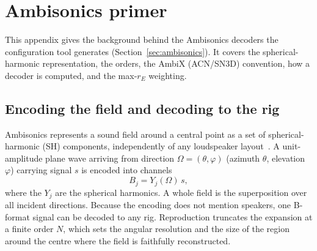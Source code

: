 \chapter{Ambisonics primer}\label{ch:ambiprimer}
This appendix gives the background behind the Ambisonics decoders the configuration tool generates (Section~\ref{sec:ambisonics}). It covers the spherical-harmonic representation, the orders, the AmbiX (ACN/SN3D) convention, how a decoder is computed, and the max-\(r_E\) weighting.

\section{Encoding the field and decoding to the rig}
Ambisonics represents a sound field around a central point as a set of spherical-harmonic (SH) components, independently of any loudspeaker layout~\cite{Gerzon1973,Daniel2000}. A unit-amplitude plane wave arriving from direction \(\Omega=(\theta,\varphi)\) (azimuth \(\theta\), elevation \(\varphi\)) carrying signal \(s\) is encoded into channels
\begin{equation}
  B_j = Y_j(\Omega)\,s ,
\end{equation}
where the \(Y_j\) are the spherical harmonics. A whole field is the superposition over all incident directions. Because the encoding does not mention speakers, one B-format signal can be decoded to any rig. Reproduction truncates the expansion at a finite order \(N\), which sets the angular resolution and the size of the region around the centre where the field is faithfully reconstructed.

